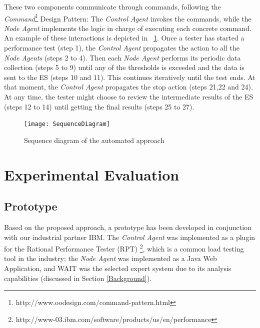 \documentclass[runningheads,a4paper]{llncs}
\newcommand{\myspaceM}{-7.6pt}
\begin{document}
These two components communicate through commands, following the
\emph{Command}\footnote{http://www.oodesign.com/command-pattern.html} Design
Pattern: The \emph{Control Agent} invokes the commands, while the \emph{Node
Agent} implements the logic in charge of executing each concrete command. An example of
these interactions is depicted in \figurename ~\ref{fig_SeqDiagram}. Once a
tester has started a performance test (step 1), the \emph{Control Agent}
propagates the action to all the \emph{Node Agents} (steps 2 to 4). Then each
\emph{Node Agent} performs its periodic data collection (steps 5 to 9) until any of the
thresholds is exceeded and the data is sent to the ES (steps 10 and 11). This
continues iteratively until the test ends. At that moment, the \emph{Control Agent} 
propagates the stop action (steps 21,22 and 24). At any time, the tester might
choose to review the intermediate results of the ES (steps 12 to 14) until
getting the final results (steps 25 to 27).

\begin{figure}[!h]
\centering
\texttt{[image: SequenceDiagram]}
\caption{Sequence diagram of the automated approach}
\label{fig_SeqDiagram}
\end{figure}

\vspace{\myspaceM{}}
\section{Experimental Evaluation}
\label{ExperimentalEvaluation}


\vspace{\myspaceM{}}
\subsection{Prototype}
\vspace{\myspaceM{}}
Based on the proposed approach, a prototype has been developed
in conjunction with our industrial partner IBM. The \emph{Control Agent} was
implemented as a plugin for the Rational Performance Tester (RPT)
\footnote{http://www-03.ibm.com/software/products/us/en/performance}, which is a
common load testing tool in the industry; the \emph{Node Agent}
was implemented as a Java Web Application, and WAIT was the selected expert
system due to its analysis capabilities (discussed in Section \ref{Background}).
\end{document}
